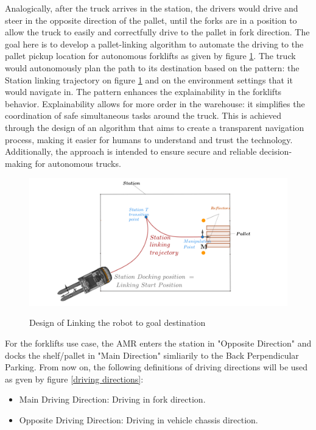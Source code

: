 Analogically, after the truck arrives in the station, the drivers would drive and steer in the opposite direction of the 
pallet, until the forks are in a position to allow the truck to easily and correctfully drive to the pallet in fork direction.
The goal here is to develop a pallet-linking algorithm to automate the driving to the pallet pickup location for 
autonomous forklifts as given by figure \ref{pattern}. The truck would autonomously plan the path to its destination
based on the pattern: the Station linking trajectory on figure \ref{pattern} and on the environment settings that it would navigate in. 
The pattern enhances the explainability in the forklifts behavior. Explainability allows for more order in the warehouse: 
it simplifies the coordination of safe simultaneous tasks around the truck. This is achieved through the design of an 
algorithm that aims to create a transparent navigation process, making it easier for humans to understand and trust 
the technology. Additionally, the approach is intended to ensure secure and reliable decision-making for autonomous trucks.



\begin{figure}
    [H]
    \begin{center}
    \includegraphics[width=\linewidth]{images/Chap2/station-without-subpolygones.png}\\
    \caption{Design of Linking the robot to goal destination \cite{R28}}
    \label{pattern}
    \end{center}
\end{figure}
For the forklifts use case, the AMR enters the station in "Opposite Direction" and docks the shelf/pallet in 
"Main Direction" simliarily to the Back Perpendicular Parking.
From now on, the following definitions of driving directions will be used as gven by figure \ref{driving directions}:
\begin{itemize}
    \item Main Driving Direction: Driving in fork direction.
    \item Opposite Driving Direction: Driving in vehicle chassis direction.
\end{itemize}

